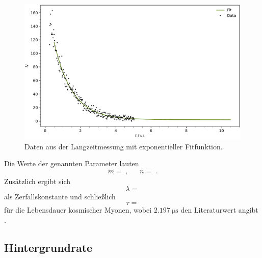 \begin{figure}[H]
	\centering
	\includegraphics[width=\textwidth]{build/lifetime.pdf}
	\caption{Daten aus der Langzeitmessung mit exponentieller Fitfunktion.}
	\label{fig:lifetime}
	\vspace{-\baselineskip}
\end{figure}

Die Werte der genannten Parameter lauten
\begin{align*}
	m =  \: , && n =  \: .
\end{align*}
Zusätzlich ergibt sich
\begin{equation*}
	\lambda = 
\end{equation*}
als Zerfallskonstante und schließlich
\begin{equation*}
	\tau = 
\end{equation*}
für die Lebensdauer kosmischer Myonen, wobei $\qty{2.197}{\micro\second}$ den Literaturwert angibt \cite{Tishchenko_2013}.



\subsection{Hintergrundrate}

